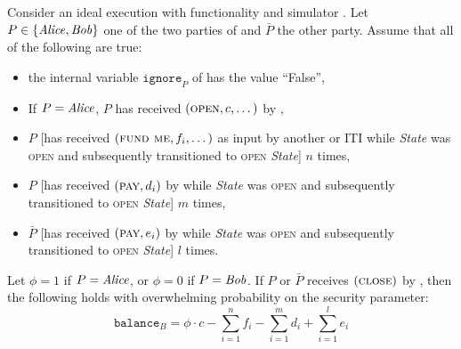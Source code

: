 \begin{lemma}
\label{lemma:ideal-balance}
  Consider an ideal execution with functionality \fchan and simulator
  \simulator.
  Let $P \in \{\mathit{Alice}, \mathit{Bob}\}$ one of the two parties of \fchan and $\bar{P}$
  the other party. Assume that all of the following are true:
  \begin{itemize}
    \item the internal variable $\texttt{ignore}_P$ of \fchan has the value
    ``False'',
    \item If $P = \mathit{Alice}$, $P$ has received $(\textsc{open}, c, \dots)$ by
    \environment,
    \item $P$ [has received $(\textsc{fund me}, f_i, \dots)$ as input by another
    \fchan or \pchan ITI while \textit{State} was \textsc{open} and subsequently
    \fchan transitioned to \textsc{open} \textit{State}] $n$ times,
    \item $P$ [has received $(\textsc{pay}, d_i)$ by \environment while
    \textit{State} was \textsc{open} and \fchan subsequently transitioned to
    \textsc{open} \textit{State}] $m$ times,
    \item $\bar{P}$ [has received $(\textsc{pay}, e_i)$ by \environment while
    \textit{State} was \textsc{open} and \fchan subsequently transitioned to
    \textsc{open} \textit{State}] $l$ times.
  \end{itemize}
  Let $\phi = 1$ if $P = \mathit{Alice}$, or $\phi = 0$ if $P = \mathit{Bob}$. If $P$ or
  $\bar{P}$ receives $(\textsc{close})$ by \simulator, then the following holds
  with overwhelming probability on the security parameter:
  \begin{equation}
    \texttt{balance}_B = \phi \cdot c - \sum\limits_{i=1}^n f_i -
    \sum\limits_{i=1}^m d_i + \sum\limits_{i=1}^l e_i
  \end{equation}
\end{lemma}
